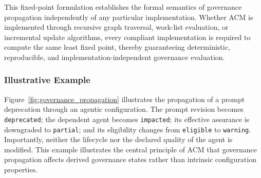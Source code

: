 \documentclass[10pt]{article}
\begin{document}
	
	This fixed-point formulation establishes the formal semantics of governance
	propagation independently of any particular implementation. Whether ACM is
	implemented through recursive graph traversal, work-list evaluation, or
	incremental update algorithms, every compliant implementation is required to
	compute the same least fixed point, thereby guaranteeing deterministic,
	reproducible, and implementation-independent governance evaluation.
	\subsubsection{Illustrative Example}
	
	Figure~\ref{fig:governance_propagation} illustrates the propagation of a prompt
	deprecation through an agentic configuration. The prompt revision becomes
	\texttt{deprecated}; the dependent agent becomes \texttt{impacted}; its
	effective assurance is downgraded to
	\texttt{partial}; and its eligibility changes from
	\texttt{eligible} to
	\texttt{warning}. Importantly, neither the lifecycle nor the declared quality
	of the agent is modified. This example illustrates the central principle of ACM
	that governance propagation affects derived governance states rather than
	intrinsic configuration properties.
	
\end{document}
